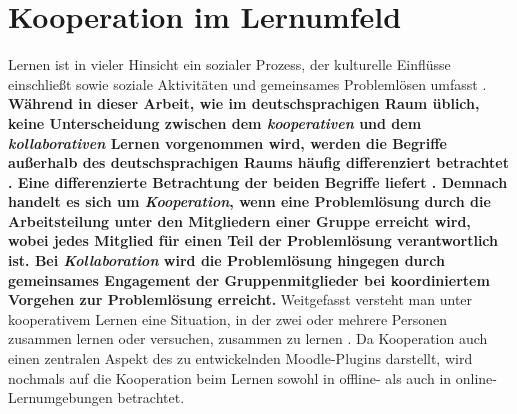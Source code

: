 \section{Kooperation im Lernumfeld}
\glqq Lernen ist in vieler Hinsicht ein sozialer Prozess, der kulturelle Einflüsse einschließt sowie soziale Aktivitäten und gemeinsames Problemlösen umfasst\grqq{} \citep{reinmann1995kooperation}. %
\textbf{Während in dieser Arbeit, wie im deutschsprachigen Raum üblich, keine Unterscheidung zwischen dem \textit{kooperativen} und dem \textit{kollaborativen} Lernen vorgenommen wird, werden die Begriffe außerhalb des deutschsprachigen Raums häufig differenziert betrachtet \citep{reinmann2002analyse}. Eine differenzierte Betrachtung der beiden Begriffe liefert \cite{dillenbourg1995evolution}. Demnach handelt es sich um \textit{Kooperation}, wenn eine Problemlösung durch die Arbeitsteilung unter den Mitgliedern einer Gruppe erreicht wird, wobei jedes Mitglied für einen Teil der Problemlösung verantwortlich ist.
Bei \textit{Kollaboration} wird die Problemlösung hingegen durch gemeinsames Engagement der Gruppenmitglieder bei koordiniertem Vorgehen zur Problemlösung erreicht.} %
Weitgefasst versteht man unter kooperativem Lernen eine Situation, in der zwei oder mehrere Personen zusammen lernen oder versuchen, zusammen zu lernen \citep{dillenbourg1999collaborative}. Da Kooperation auch einen zentralen Aspekt des zu entwickelnden Moodle-Plugins darstellt, wird nochmals auf die Kooperation beim Lernen sowohl in offline- als auch in online-Lernumgebungen betrachtet.





